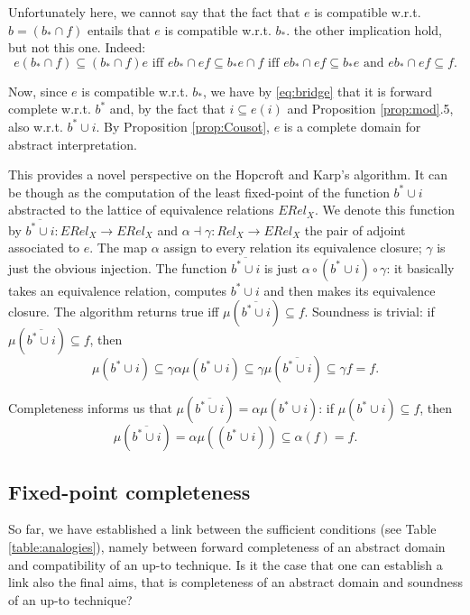 \documentclass{llncs}
\begin{document}
\begin{remark}
Unfortunately here, we cannot say that the fact that $e$ is compatible w.r.t. $b=(b_*\cap f)$ entails that $e$ is compatible w.r.t. $b_*$. the other implication hold, but not this one. Indeed: 
$$e(b_*\cap f) \subseteq (b_*\cap f) e \text{ iff } eb_* \cap ef \subseteq b_* e \cap f \text{ iff }  eb_* \cap ef \subseteq b_* e \text{ and }  eb_* \cap ef \subseteq  f\text{.}$$
\end{remark}

Now, since $e$ is compatible w.r.t. $b_*$, we have by \eqref{eq:bridge} that it is forward complete w.r.t. $b^*$ and, by the fact that $i\subseteq e(i)$ and Proposition \ref{prop:mod}.5, also w.r.t. $b^*\cup i$. By Proposition \ref{prop:Cousot}, $e$ is a complete domain for abstract interpretation. 

This provides a novel perspective on the Hopcroft and Karp's algorithm. It can be though as the computation of the least fixed-point  of the function $b^*\cup i$ abstracted to the lattice of equivalence relations $ERel_X$. We denote this function by $\overline{b^*\cup i}\colon ERel_X \to ERel_X$ and $\alpha \dashv \gamma \colon Rel_X \to ERel_X$ the pair of adjoint associated to $e$. The map $\alpha$ assign to every relation its equivalence closure; $\gamma$ is just the obvious injection. The function $\overline{b^*\cup i}$ is just $\alpha \circ (b^*\cup i) \circ \gamma$: it basically takes an equivalence relation, computes $b^*\cup i$ and then makes its equivalence closure. The algorithm returns true iff $\mu (\overline{b^*\cup i}) \subseteq f$. Soundness is trivial: if $\mu (\overline{b^*\cup i})  \subseteq f$, then $$\mu (b^*\cup i) \subseteq \gamma \alpha \mu (b^*\cup i) \subseteq \gamma \mu (\overline{b^*\cup i}) \subseteq \gamma  f =f\text{.}$$

Completeness informs us that $\mu  (\overline{b^*\cup i}) = \alpha  \mu (b^*\cup i)$: if $\mu (b^*\cup i) \subseteq f$, then $$\mu (\overline{b^*\cup i})  = \alpha \mu ((b^*\cup i)) \subseteq \alpha(f) = f\text{.}$$

\subsection{Fixed-point completeness}
So far, we have established a link between the sufficient conditions (see Table \ref{table:analogies}), namely between forward completeness of an abstract domain and compatibility of an up-to technique. Is it the case that one can establish a link also the final aims, that is completeness of an abstract domain and soundness of an up-to technique?
\end{document}
